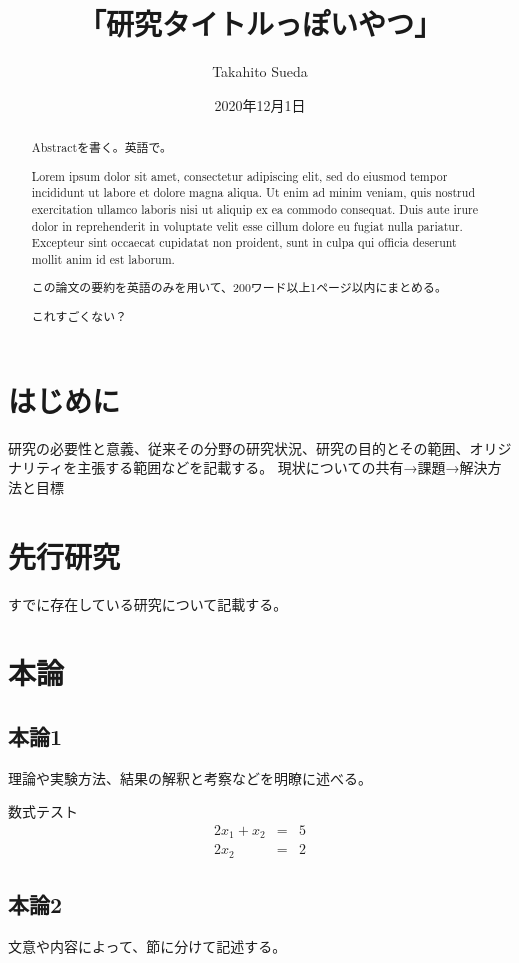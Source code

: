 \documentclass[a4paper, xelatex]{bxjsarticle}
\title{「研究タイトルっぽいやつ」}
\author{Takahito Sueda}
\date{2020年12月1日}
\affiliation{情報システム系} %
\begin{document}
  \maketitle

  \begin{abstract}
    Abstractを書く。英語で。

    Lorem ipsum dolor sit amet, consectetur adipiscing elit, sed do eiusmod tempor incididunt ut labore et dolore magna aliqua. Ut enim ad minim veniam, quis nostrud exercitation ullamco laboris nisi ut aliquip ex ea commodo consequat. Duis aute irure dolor in reprehenderit in voluptate velit esse cillum dolore eu fugiat nulla pariatur. Excepteur sint occaecat cupidatat non proident, sunt in culpa qui officia deserunt mollit anim id est laborum.

    この論文の要約を英語のみを用いて、200ワード以上1ページ以内にまとめる。

    これすごくない？
  \end{abstract}

  \tableofcontents

  \section{はじめに}
  研究の必要性と意義、従来その分野の研究状況、研究の目的とその範囲、オリジナリティを主張する範囲などを記載する。
  現状についての共有→課題→解決方法と目標

  \section{先行研究}
  すでに存在している研究について記載する。

  \section{本論}

  \subsection{本論1}
  理論や実験方法、結果の解釈と考察などを明瞭に述べる。

  数式テスト
  \begin{eqnarray}
    2x_1 + x_2 & = & 5 \\
    2x_2 & = & 2
  \end{eqnarray}

  \subsection{本論2}
  文意や内容によって、節に分けて記述する。
\end{document}
